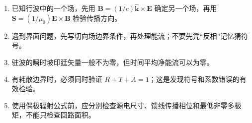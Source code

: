 \begin{enumerate}
\def\labelenumi{\arabic{enumi}.}
\tightlist
\item
  已知行波中的一个场，先用
  \(\mathbf B=(1/c)\hat{\mathbf k}\times\mathbf E\) 确定另一个场，再用
  \(\mathbf S=(1/\mu_0)\mathbf E\times\mathbf B\) 检验传播方向。
\item
  遇到界面问题，先写切向场边界条件，再处理能流；不要先凭``反相''记忆猜符号。
\item
  驻波的瞬时坡印廷矢量一般不为零，但时间平均净能流可以为零。
\item
  有耗散边界时，必须同时验证
  \(R+T+A=1\)；这是发现符号和系数错误的有效检验。
\item
  使用偶极辐射公式前，应分别检查源电尺寸、馈线传播相位和最低非零多极矩，不能只检查回路面积。
\end{enumerate}
\clearpage
\endgroup
